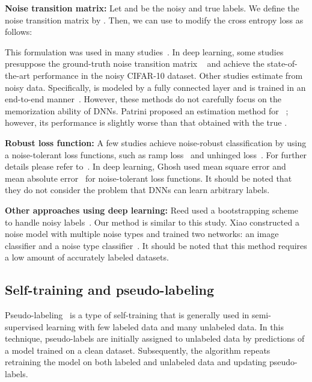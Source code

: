 \documentclass[10pt,twocolumn,letterpaper]{article}
\begin{document}
\vspace{2mm}\noindent\textbf{Noise transition matrix:}
Let  and  be the noisy and true labels. We define the noise transition matrix  by . Then, we can use  to modify the cross entropy loss as follows:

This formulation was used in many studies~\cite{sukhbaatar2014training,jindal2016learning,patrini2016making}.
In deep learning, some studies presuppose the ground-truth noise transition matrix ~\cite{patrini2016making,vahdat2017toward} and achieve the state-of-the-art performance in the noisy CIFAR-10 dataset. Other studies estimate  from noisy data. Specifically,  is modeled by a fully connected layer and is trained in an end-to-end manner~\cite{sukhbaatar2014training,jindal2016learning}.
However, these methods do not carefully focus on the memorization ability of DNNs. Patrini \etal proposed an estimation method for ~\cite{patrini2016making}; however, its performance is slightly worse than that obtained with the true .

\vspace{2mm}\noindent\textbf{Robust loss function:}
A few studies achieve noise-robust classification by using a noise-tolerant loss functions, such as ramp loss~\cite{brooks2011support} and unhinged loss~\cite{van2015learning}. For further details please refer to~\cite{ghosh2015making}. In deep learning, Ghosh \etal used mean square error and mean absolute error~\cite{ghosh2017robust} for noise-tolerant loss functions. It should be noted that they do not consider the problem that DNNs can learn arbitrary labels.

\vspace{2mm}\noindent\textbf{Other approaches using deep learning:}
Reed \etal used a bootstrapping scheme to handle noisy labels~\cite{reed2014training}. Our method is similar to this study.
Xiao \etal constructed a noise model with multiple noise types and trained two networks: an image classifier and a noise type classifier~\cite{xiao2015learning}. It should be noted that this method requires a low amount of accurately labeled datasets.

\subsection{Self-training and pseudo-labeling}
Pseudo-labeling~\cite{zhu2006semi,haffari2012analysis,lee2013pseudo} is a type of self-training that is generally used in semi-supervised learning with few labeled data and many unlabeled data. In this technique, pseudo-labels are initially assigned to unlabeled data by predictions of a model trained on a clean dataset. Subsequently, the algorithm repeats retraining the model on both labeled and unlabeled data and updating pseudo-labels.
\end{document}
